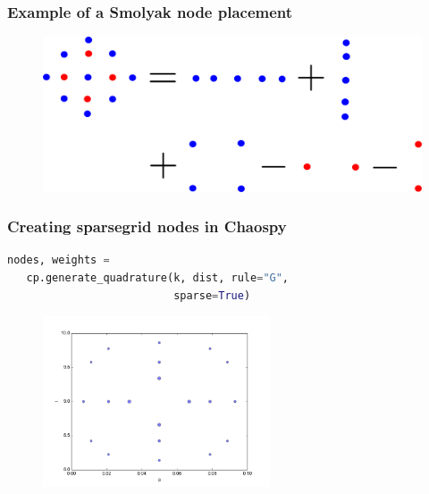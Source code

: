 \documentclass{beamer}
\begin{document}
\begin{frame}
 \frametitle{Example of a Smolyak node placement}
 \begin{figure}
  \includegraphics[width=\textwidth]{smolyak.png}
 \end{figure}

\end{frame}


\begin{frame}[fragile]
 \frametitle{Creating sparsegrid nodes in Chaospy}
 \begin{lstlisting}[language=python]
  nodes, weights = 
   cp.generate_quadrature(k, dist, rule="G",
                          sparse=True)
 \end{lstlisting}

 \pause
 \begin{figure}
  \includegraphics[width=0.6\textwidth]{nodes_sparse.png}
 \end{figure}
\end{frame}
\end{document}
